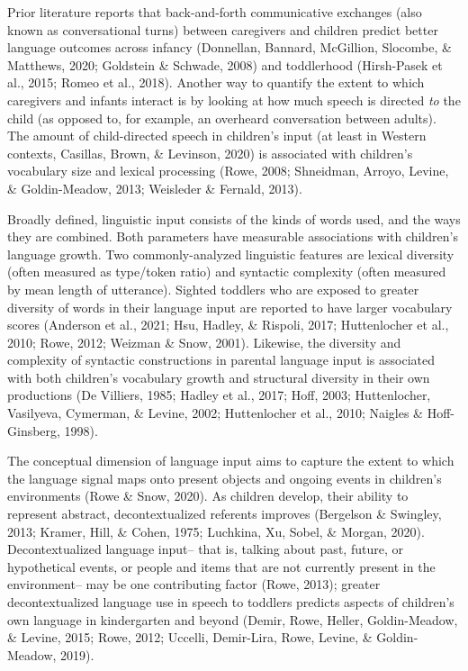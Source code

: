 \documentclass[
  man]{apa6}
\begin{document}
Prior literature reports that back-and-forth communicative exchanges (also known as conversational turns) between caregivers and children predict better language outcomes across infancy (Donnellan, Bannard, McGillion, Slocombe, \& Matthews, 2020; Goldstein \& Schwade, 2008) and toddlerhood (Hirsh-Pasek et al., 2015; Romeo et al., 2018). Another way to quantify the extent to which caregivers and infants interact is by looking at how much speech is directed \emph{to} the child (as opposed to, for example, an overheard conversation between adults). The amount of child-directed speech in children's input (at least in Western contexts, Casillas, Brown, \& Levinson, 2020) is associated with children's vocabulary size and lexical processing (Rowe, 2008; Shneidman, Arroyo, Levine, \& Goldin-Meadow, 2013; Weisleder \& Fernald, 2013).

Broadly defined, linguistic input consists of the kinds of words used, and the ways they are combined. Both parameters have measurable associations with children's language growth. Two commonly-analyzed linguistic features are lexical diversity (often measured as type/token ratio) and syntactic complexity (often measured by mean length of utterance). Sighted toddlers who are exposed to greater diversity of words in their language input are reported to have larger vocabulary scores (Anderson et al., 2021; Hsu, Hadley, \& Rispoli, 2017; Huttenlocher et al., 2010; Rowe, 2012; Weizman \& Snow, 2001). Likewise, the diversity and complexity of syntactic constructions in parental language input is associated with both children's vocabulary growth and structural diversity in their own productions (De Villiers, 1985; Hadley et al., 2017; Hoff, 2003; Huttenlocher, Vasilyeva, Cymerman, \& Levine, 2002; Huttenlocher et al., 2010; Naigles \& Hoff-Ginsberg, 1998).

The conceptual dimension of language input aims to capture the extent to which the language signal maps onto present objects and ongoing events in children's environments (Rowe \& Snow, 2020). As children develop, their ability to represent abstract, decontextualized referents improves (Bergelson \& Swingley, 2013; Kramer, Hill, \& Cohen, 1975; Luchkina, Xu, Sobel, \& Morgan, 2020). Decontextualized language input-- that is, talking about past, future, or hypothetical events, or people and items that are not currently present in the environment-- may be one contributing factor (Rowe, 2013); greater decontextualized language use in speech to toddlers predicts aspects of children's own language in kindergarten and beyond (Demir, Rowe, Heller, Goldin-Meadow, \& Levine, 2015; Rowe, 2012; Uccelli, Demir-Lira, Rowe, Levine, \& Goldin-Meadow, 2019).
\end{document}
